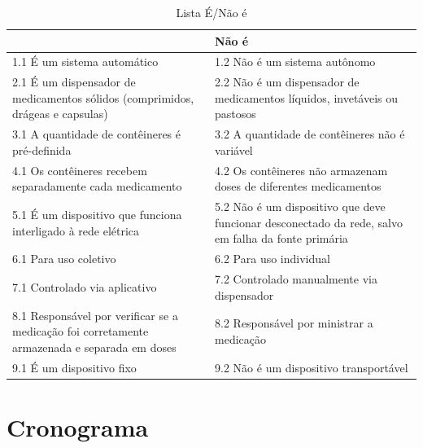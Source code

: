 \begin{apendicesenv}
\begin{table}[H]
    \centering
    \caption{Lista É/Não é}
    \label{tab:lista_e_n_e}
    \begin{tabularx}{\textwidth}{|X|X|}
        \hline
        \rowcolor[HTML]{A8DADC}
        \multicolumn{1}{|X}{\textbf{É}} & \multicolumn{1}{|X|}{\textbf{Não é}} \\ 
        \hline
        1.1 É um sistema automático & 1.2 Não é um sistema autônomo \\ 
        \hline
        2.1 É um dispensador de medicamentos sólidos (comprimidos, drágeas e capsulas) & 2.2 Não é um dispensador de medicamentos líquidos, invetáveis ou pastosos \\ 
        \hline
        3.1 A quantidade de contêineres é pré-definida & 3.2 A quantidade de contêineres não é variável\\ 
        \hline
        4.1 Os contêineres recebem separadamente cada medicamento & 4.2 Os contêineres não armazenam doses de diferentes medicamentos \\
        \hline
        5.1 É um dispositivo que funciona interligado à rede elétrica & 5.2 Não é um dispositivo que deve funcionar desconectado da rede, salvo em falha da fonte primária \\ 
        \hline
        6.1 Para uso coletivo & 6.2 Para uso individual\\ 
        \hline
        7.1 Controlado via aplicativo & 7.2 Controlado manualmente via dispensador\\ 
        \hline
        8.1 Responsável por verificar se a medicação foi corretamente armazenada e separada em doses & 8.2 Responsável por ministrar a medicação\\ 
        \hline
        9.1 É um dispositivo fixo & 9.2 Não é um dispositivo transportável \\ 
        \hline
    \end{tabularx}
\end{table}


\chapter{Cronograma}\label{roadmap}


\end{apendicesenv}
